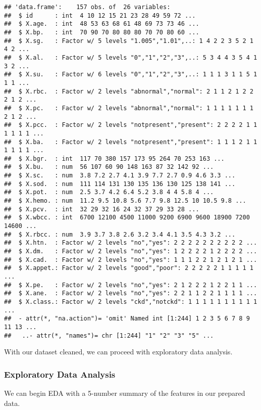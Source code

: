 \documentclass[
]{article}
\begin{document}
\begin{verbatim}
## 'data.frame':    157 obs. of  26 variables:
##  $ id      : int  4 10 12 15 21 23 28 49 59 72 ...
##  $ X.age.  : int  48 53 63 68 61 48 69 73 73 46 ...
##  $ X.bp.   : int  70 90 70 80 80 80 70 70 80 60 ...
##  $ X.sg.   : Factor w/ 5 levels "1.005","1.01",..: 1 4 2 2 3 5 2 1 4 2 ...
##  $ X.al.   : Factor w/ 5 levels "0","1","2","3",..: 5 3 4 4 3 5 4 1 3 2 ...
##  $ X.su.   : Factor w/ 6 levels "0","1","2","3",..: 1 1 1 3 1 1 5 1 1 1 ...
##  $ X.rbc.  : Factor w/ 2 levels "abnormal","normal": 2 1 1 2 1 2 2 2 1 2 ...
##  $ X.pc.   : Factor w/ 2 levels "abnormal","normal": 1 1 1 1 1 1 1 2 1 2 ...
##  $ X.pcc.  : Factor w/ 2 levels "notpresent","present": 2 2 2 2 1 1 1 1 1 1 ...
##  $ X.ba.   : Factor w/ 2 levels "notpresent","present": 1 1 1 2 1 1 1 1 1 1 ...
##  $ X.bgr.  : int  117 70 380 157 173 95 264 70 253 163 ...
##  $ X.bu.   : num  56 107 60 90 148 163 87 32 142 92 ...
##  $ X.sc.   : num  3.8 7.2 2.7 4.1 3.9 7.7 2.7 0.9 4.6 3.3 ...
##  $ X.sod.  : num  111 114 131 130 135 136 130 125 138 141 ...
##  $ X.pot.  : num  2.5 3.7 4.2 6.4 5.2 3.8 4 4 5.8 4 ...
##  $ X.hemo. : num  11.2 9.5 10.8 5.6 7.7 9.8 12.5 10 10.5 9.8 ...
##  $ X.pcv.  : int  32 29 32 16 24 32 37 29 33 28 ...
##  $ X.wbcc. : int  6700 12100 4500 11000 9200 6900 9600 18900 7200 14600 ...
##  $ X.rbcc. : num  3.9 3.7 3.8 2.6 3.2 3.4 4.1 3.5 4.3 3.2 ...
##  $ X.htn.  : Factor w/ 2 levels "no","yes": 2 2 2 2 2 2 2 2 2 2 ...
##  $ X.dm.   : Factor w/ 2 levels "no","yes": 1 2 2 2 2 1 2 2 2 2 ...
##  $ X.cad.  : Factor w/ 2 levels "no","yes": 1 1 1 2 2 1 2 1 2 1 ...
##  $ X.appet.: Factor w/ 2 levels "good","poor": 2 2 2 2 2 1 1 1 1 1 ...
##  $ X.pe.   : Factor w/ 2 levels "no","yes": 2 1 2 2 2 1 2 2 1 1 ...
##  $ X.ane.  : Factor w/ 2 levels "no","yes": 2 2 1 1 2 2 1 1 1 1 ...
##  $ X.class.: Factor w/ 2 levels "ckd","notckd": 1 1 1 1 1 1 1 1 1 1 ...
##  - attr(*, "na.action")= 'omit' Named int [1:244] 1 2 3 5 6 7 8 9 11 13 ...
##   ..- attr(*, "names")= chr [1:244] "1" "2" "3" "5" ...
\end{verbatim}

With our dataset cleaned, we can proceed with exploratory data analysis.

\hypertarget{exploratory-data-analysis}{%
\subsubsection{Exploratory Data
Analysis}\label{exploratory-data-analysis}}

We can begin EDA with a 5-number summary of the features in our prepared
data.
\end{document}
